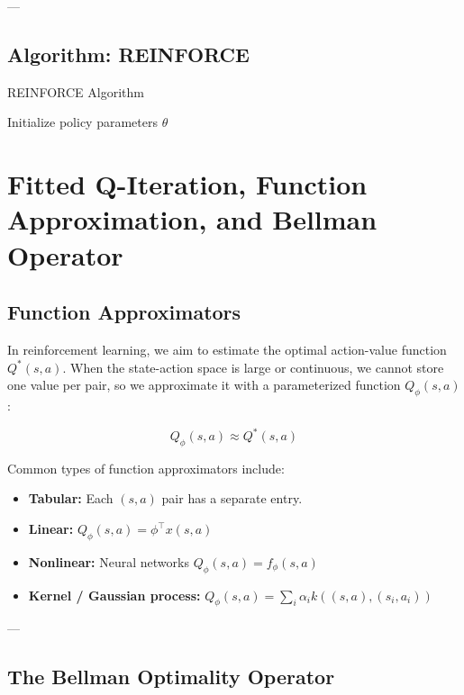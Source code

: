 \documentclass[12pt]{article}
\theoremstyle{definition} %
\theoremstyle{plain} %
\theoremstyle{remark} %
\begin{document}
\begin{CJK}{UTF8}{gbsn}
---

\subsection{Algorithm: REINFORCE}

\begin{algorithm}[H]
\caption{REINFORCE Algorithm}
Initialize policy parameters $\theta$ \;
\end{algorithm}



\section{Fitted Q-Iteration, Function Approximation, and Bellman Operator}

\subsection{Function Approximators}

In reinforcement learning, we aim to estimate the optimal action-value function \( Q^*(s,a) \).  
When the state-action space is large or continuous, we cannot store one value per pair, so we approximate it with a parameterized function \( Q_\phi(s,a) \):

\[
Q_\phi(s,a) \approx Q^*(s,a)
\]

Common types of function approximators include:

\begin{itemize}
    \item \textbf{Tabular:} Each \( (s,a) \) pair has a separate entry.
    \item \textbf{Linear:} \( Q_\phi(s,a) = \phi^\top x(s,a) \)
    \item \textbf{Nonlinear:} Neural networks \( Q_\phi(s,a) = f_\phi(s,a) \)
    \item \textbf{Kernel / Gaussian process:} \( Q_\phi(s,a) = \sum_i \alpha_i k((s,a),(s_i,a_i)) \)
\end{itemize}

---

\subsection{The Bellman Optimality Operator}


\end{CJK}
\end{document}
